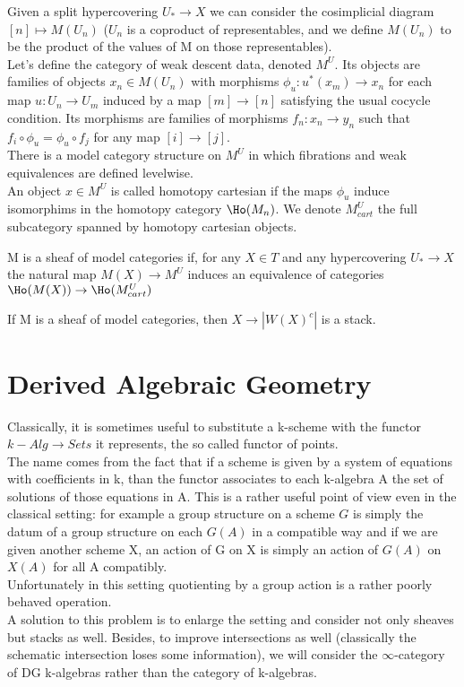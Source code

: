 Given a split hypercovering $U_*\to X$ we can consider the cosimplicial diagram $[n]\mapsto M(U_n)$ ($U_n$ is a coproduct of representables, and we define $M(U_n)$ to be
 the product of the values of M on those representables).\\
Let's define the category of weak descent data, denoted $M^U$. Its objects are families of objects $x_n\in M(U_n)$ with morphisms $\phi_u:u^*(x_m)\to x_n$ for each 
map $u:U_n\to U_m$ induced by a map $[m]\to [n]$
satisfying the usual cocycle condition. Its morphisms are families of morphisms $f_n: x_n\to y_n$ such that $f_i\circ \phi_u=\phi_u\circ f_j$ for any map $[i]\to[j]$.\\
There is a model category structure on $M^U$ in which fibrations and weak equivalences are defined levelwise.\\
An object $x\in M^U$ is called homotopy cartesian if the maps $\phi_u$ induce isomorphims in the homotopy category $\Ho(M_n)$. We denote $M^U_{cart}$ the full subcategory
spanned by homotopy cartesian objects.

\begin{defin}
M is a sheaf of model categories if, for any $X\in T$ and any hypercovering $U_*\to X$ the natural map $M(X)\to M^U$ induces an equivalence of categories $\Ho(M(X))\to \Ho(M^U_{cart})$
\end{defin}

\begin{thm}
\label{quillen sheaf}
If M is a sheaf of model categories, then $X\to |W(X)^c|$ is a stack. 
\end{thm}


\section{Derived Algebraic Geometry}

Classically, it is sometimes useful to substitute a k-scheme with the functor $k-Alg\to Sets$ it represents, the so called functor of points.\\
The name comes from the fact that if a scheme is given by a system of equations with coefficients in k, than the functor associates to each k-algebra A the set
of solutions of those equations in A. This is a rather useful point of view even in the classical setting: for example a group structure on a scheme $G$
is simply the datum of a group structure on each $G(A)$ in a compatible way and if we are given another scheme X, an action of G on X is simply an
action of $G(A)$ on $X(A)$ for all A compatibly.\\
Unfortunately in this setting quotienting by a group action is a rather poorly behaved operation.\\
A solution to this problem is to enlarge the setting and consider not only sheaves but stacks as well. Besides, to improve intersections as well (classically the schematic
intersection loses some information), we will consider the $\infty$-category of DG k-algebras rather than the category of k-algebras.\\


